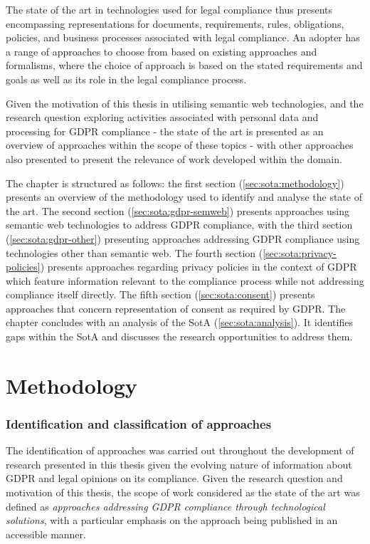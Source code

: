 The state of the art in technologies used for legal compliance thus presents encompassing representations for documents, requirements, rules, obligations, policies, and business processes associated with legal compliance. An adopter has a range of approaches to choose from based on existing approaches and formalisms, where the choice of approach is based on the stated requirements and goals as well as its role in the legal compliance process.

Given the motivation of this thesis in utilising semantic web technologies, and the research question exploring activities associated with personal data and processing for GDPR compliance - the state of the art is presented as an overview of approaches within the scope of these topics - with other approaches also presented to present the relevance of work developed within the domain.

The chapter is structured as follows: the first section (\autoref{sec:sota:methodology}) presents an overview of the methodology used to identify and analyse the state of the art. 
The second section (\autoref{sec:sota:gdpr-semweb}) presents approaches using semantic web technologies to address GDPR compliance, with the third section  (\autoref{sec:sota:gdpr-other}) presenting approaches addressing GDPR compliance using technologies other than semantic web.
The fourth section (\autoref{sec:sota:privacy-policies}) presents approaches regarding privacy policies in the context of GDPR which feature information relevant to the compliance process while not addressing compliance itself directly.
The fifth section (\autoref{sec:sota:consent}) presents approaches that concern representation of consent as required by GDPR.
The chapter concludes with an analysis of the SotA (\autoref{sec:sota:analysis}). It identifies gaps within the SotA and discusses the research opportunities to address them.

\section{Methodology}\label{sec:sota:methodology}

\subsubsection{Identification and classification of approaches}
The identification of approaches was carried out throughout the development of research presented in this thesis given the evolving nature of information about GDPR and legal opinions on its compliance.
Given the research question and motivation of this thesis, the scope of work considered as the state of the art was defined as \textit{approaches addressing GDPR compliance through technological solutions}, with a particular emphasis on the approach being published in an accessible manner.

